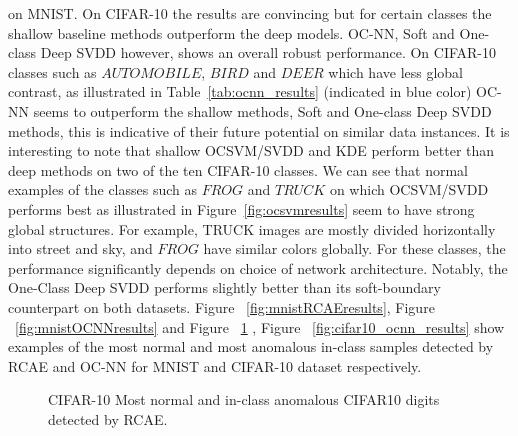 on MNIST. On CIFAR-10 the results are convincing but for certain classes the shallow baseline methods outperform the deep models. OC-NN, Soft and One-class Deep SVDD however, shows an overall robust performance. On CIFAR-10 classes such as $AUTOMOBILE$, $BIRD$ and $DEER$ which have less global contrast, as illustrated in Table~\ref{tab:ocnn_results} (indicated in blue color)  OC-NN seems to outperform the shallow methods, Soft and One-class Deep SVDD methods, this is indicative of their future potential on similar data instances.  It is interesting to note that shallow OCSVM/SVDD and KDE perform better than deep methods on two of the ten CIFAR-10 classes. We can see that normal examples of the classes  such as $FROG$ and $TRUCK$ on which OCSVM/SVDD performs best as illustrated in Figure~\ref{fig:ocsvmresults} seem to have strong global structures. For example, TRUCK images are mostly divided horizontally into street and sky, and  $FROG$ have similar colors globally. For these classes,  the performance significantly depends on choice of network architecture. Notably, the One-Class Deep SVDD performs slightly better than its soft-boundary counterpart on both datasets. Figure ~\ref{fig:mnistRCAEresults}, Figure ~\ref{fig:mnistOCNNresults} and Figure ~\ref{fig:cifar10_rcae_results} , Figure ~\ref{fig:cifar10_ocnn_results} show examples of the most normal and most anomalous in-class samples detected by RCAE and OC-NN for MNIST and CIFAR-10 dataset respectively.

\begin{figure}
\hspace{0.5cm}
\caption{CIFAR-10 Most normal and in-class anomalous CIFAR10 digits detected by RCAE. }
\label{fig:cifar10_rcae_results}
\end{figure}


